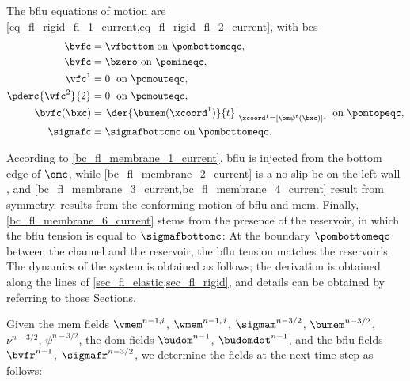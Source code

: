 The \ac{bflu} equations of motion are \cref{eq_fl_rigid_fl_1_current,eq_fl_rigid_fl_2_current}, with \acp{bc}
\begin{align}
    \label{bc_fl_membrane_1_current}
    \bvfc             & =  \vfbottom  \text{ on } \pombottomeqc,                                                                 \\
    \label{bc_fl_membrane_2_current}
    \bvfc             & =  \bzero  \text{ on } \pomineqc,                                                                        \\
    \label{bc_fl_membrane_3_current}
    \vfc^1            & =  0 \; \text{ on } \pomouteqc ,                                                                         \\
    \label{bc_fl_membrane_4_current}
    \pderc{\vfc^2}{2} & =  0 \; \text{ on } \pomouteqc ,                                                                         \\
    \label{bc_fl_membrane_5_current}
    \bvfc(\bxc)       & = \left. \der{\bumem(\xcoord^1)}{t} \right|_{\xcoord^1 = [{\bm \psi}^t(\bxc)]^1} \text{ on } \pomtopeqc, \\
    \label{bc_fl_membrane_6_current}
    \sigmafc          & = \sigmafbottomc \text{ on } \pombottomeqc.
\end{align}

According to \cref{bc_fl_membrane_1_current}, \ac{bflu} is injected from the bottom edge of $\omc$, while \cref{bc_fl_membrane_2_current} is a no-slip \ac{bc} on the left wall \pominc, and \cref{bc_fl_membrane_3_current,bc_fl_membrane_4_current} result from symmetry.    results from the conforming motion \cite{kamenskyLectureNotesMAE} of \ac{bflu} and \ac{mem}. Finally,  \cref{bc_fl_membrane_6_current} stems from the presence of the reservoir, in which the \ac{bflu}  tension is equal to $\sigmafbottomc$: At the boundary $\pombottomeqc$ between the channel and the reservoir, the \ac{bflu} tension  matches the reservoir's.\vspace{0.5cm}\\



The  dynamics of the system is obtained as follows; the derivation is obtained along the lines of \cref{sec_fl_elastic,sec_fl_rigid}, and details can be obtained by referring to those Sections.

Given the \ac{mem} fields $\vmem^{n-1, i}$, $\wmem^{n-1, \, i}$, $\sigmam^{n-3/2}$, $\bumem^{n-3/2}$, $\nu^{n-3/2}$, $\psi^{n-3/2}$, the \ac{dom} fields $\budom^{n-1}$, $\budomdot^{n-1}$, and the \ac{bflu} fields $\bvfr^{n-1}$, $\sigmafr^{n-3/2}$, we determine the fields at the next time step as follows:


